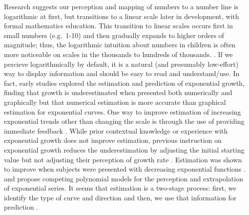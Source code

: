 \documentclass[]{interact}
\theoremstyle{plain}%
\theoremstyle{definition}
\theoremstyle{remark}
\begin{document}
Research suggests our perception and mapping of numbers to a number line
is logarithmic at first, but transitions to a linear scale later in
development, with formal mathematics education. This transition to
linear scales occurs first in small numbers (e.g.~1-10) and then
gradually expands to higher orders of magnitude; thus, the logarithmic
intuition about numbers in children is often more noticeable on scales
in the thousands to hundreds of thousands.
\citep{varshney_why_2013, siegler_numerical_2017, dehaeneLogLinearDistinct2008}.
If we percieve logarithmically by default, it is a natural (and
presumably low-effort) way to display information and should be easy to
read and understand/use. In fact, early studies explored the estimation
and prediction of exponential growth, finding that growth is
underestimated when presented both numerically and graphically but that
numerical estimation is more accurate than graphical estimation for
exponential curves. One way to improve estimation of increasing
exponential trends other than changing the scale is through the use of
providing immediate feedback \citep{mackinnon_feedback_1991}. While
prior contextual knowledge or experience with exponential growth does
not improve estimation, previous instruction on exponential growth
reduces the underestimation by adjusting the initial starting value but
not adjusting their perception of growth rate
\citep{wagenaar_misperception_1975, jones_polynomial_1977}. Estimation
was shown to improve when subjects were presented with decreasing
exponential functions \citep{timmers_inverse_1977}.
\citet{jones_polynomial_1977,jones_generalized_1979} and
\citet{wagenaar_extrapolation_1978} propose competing polynomial models
for the perception and extrapolation of exponential series. It seems
that estimation is a two-stage process: first, we identify the type of
curve and direction and then, we use that information for prediction
\citep{best_perception_2007}.
\end{document}
